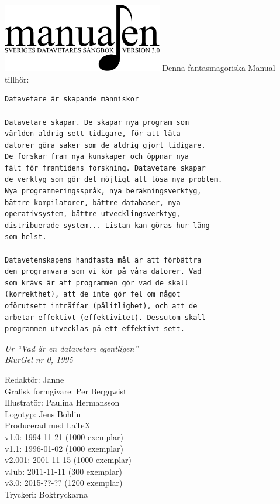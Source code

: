\documentclass[a6paper,fontsize=10pt,twoside,open=right]{scrbook}
\begin{document}
\setlength{\parindent}{0pt}
\vspace*{6.5cm}
\hspace*{0.9cm}
\includegraphics[keepaspectratio,width=7cm]{elements/logo.pdf}
\clearpage
\noindent Denna fantasmagoriska Manual tillhör:
\ohead{\textnormal{\textsc{\scriptsize\leftmark}}}
\ofoot[\pagemark]{\textsc{\scriptsize\pagemark}}
\clearpage
{\small\begin{verbatim}
Datavetare är skapande människor

Datavetare skapar. De skapar nya program som
världen aldrig sett tidigare, för att låta
datorer göra saker som de aldrig gjort tidigare.
De forskar fram nya kunskaper och öppnar nya
fält för framtidens forskning. Datavetare skapar
de verktyg som gör det möjligt att lösa nya problem.
Nya programmeringsspråk, nya beräkningsverktyg,
bättre kompilatorer, bättre databaser, nya
operativsystem, bättre utvecklingsverktyg,
distribuerade system... Listan kan göras hur lång
som helst.
  
Datavetenskapens handfasta mål är att förbättra
den programvara som vi kör på våra datorer. Vad
som krävs är att programmen gör vad de skall
(korrekthet), att de inte gör fel om något
oförutsett inträffar (pålitlighet), och att de
arbetar effektivt (effektivitet). Dessutom skall
programmen utvecklas på ett effektivt sett.
\end{verbatim}}
\vspace{10pt}
{\footnotesize\textit{Ur ``Vad är en datavetare
egentligen''\\ BlurGel nr 0, 1995}}
\clearpage
\setlength{\parindent}{15pt}
\null
\vfill
    {\noindent\small\centering
      Redaktör: Janne\\
      Grafisk formgivare: Per Bergqwist\\
      Illustratör: Paulina Hermansson\\
      Logotyp: Jens Bohlin\\
      Producerad med \LaTeX\\
      v1.0: 1994-11-21 (1000 exemplar)\\
      v1.1: 1996-01-02 (1000 exemplar)\\
      v2.001: 2001-11-15 (1000 exemplar)\\
      vJub: 2011-11-11 (300 exemplar)\\
      v3.0: 2015-??-?? (1200 exemplar)\\
      Tryckeri: Boktryckarna\par
    }
\cleardoublepage
\end{document}
